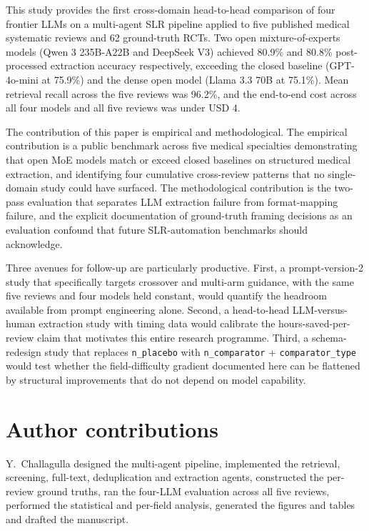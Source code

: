 \documentclass[a4paper,fleqn]{cas-sc}
\begin{document}
This study provides the first cross-domain head-to-head comparison of
four frontier LLMs on a multi-agent SLR pipeline applied to five
published medical systematic reviews and 62 ground-truth RCTs. Two
open mixture-of-experts models (Qwen 3 235B-A22B and DeepSeek V3)
achieved 80.9\% and 80.8\% post-processed extraction accuracy
respectively, exceeding the closed baseline (GPT-4o-mini at 75.9\%) and
the dense open model (Llama 3.3 70B at 75.1\%). Mean retrieval recall
across the five reviews was 96.2\%, and the end-to-end cost across all
four models and all five reviews was under USD 4.

The contribution of this paper is empirical and methodological. The
empirical contribution is a public benchmark across five
medical specialties demonstrating that open MoE models match or exceed
closed baselines on structured medical extraction, and identifying four
cumulative cross-review patterns that no single-domain study could have
surfaced. The methodological contribution is the two-pass evaluation
that separates LLM extraction failure from format-mapping failure, and
the explicit documentation of ground-truth framing decisions as an
evaluation confound that future SLR-automation benchmarks should
acknowledge.

Three avenues for follow-up are particularly productive. First, a
prompt-version-2 study that specifically targets crossover and
multi-arm guidance, with the same five reviews and four models held
constant, would quantify the headroom available from prompt engineering
alone. Second, a head-to-head LLM-versus-human extraction study with
timing data would calibrate the hours-saved-per-review claim that
motivates this entire research programme. Third, a schema-redesign study
that replaces \texttt{n\_placebo} with \texttt{n\_comparator} +
\texttt{comparator\_type} would test whether the field-difficulty
gradient documented here can be flattened by structural improvements
that do not depend on model capability.

\section*{Author contributions}
Y.~Challagulla designed the multi-agent pipeline, implemented the
retrieval, screening, full-text, deduplication and extraction agents,
constructed the per-review ground truths, ran the four-LLM evaluation
across all five reviews, performed the statistical and per-field
analysis, generated the figures and tables and drafted the manuscript.
\end{document}

